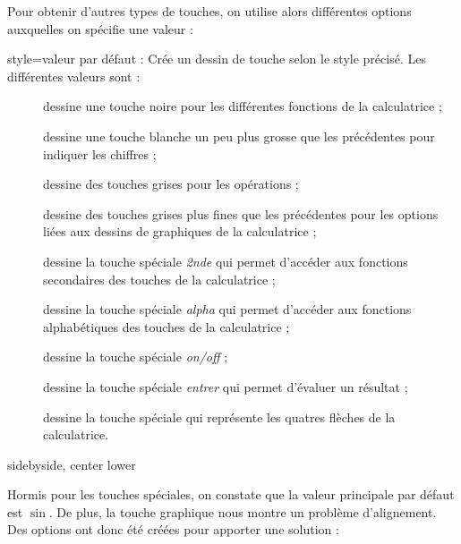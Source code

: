 \documentclass[10pt,french,a4paper]{article}
\begin{document}
Pour obtenir d'autres types de touches, on utilise alors différentes options auxquelles on spécifie une valeur :

\begin{docKey}{style}{=}{valeur par défaut : }
Crée un dessin de touche selon le style précisé. Les différentes valeurs sont :
\end{docKey}
\begin{description}
    \item[]  dessine une touche noire pour les différentes fonctions de la calculatrice ;
    \item[] dessine une touche blanche un peu plus grosse que les précédentes pour indiquer les chiffres ;
    \item[] dessine des touches grises pour les opérations ;
    \item[] dessine des touches grises plus fines que les précédentes pour les options liées aux dessins de graphiques de la calculatrice ;
    \item[] dessine la touche spéciale \textit{2nde} qui permet d'accéder aux fonctions secondaires des touches de la calculatrice ;
    \item[] dessine la touche spéciale \textit{alpha} qui permet d'accéder aux fonctions alphabétiques des touches de la calculatrice ;
    \item[] dessine la touche spéciale \textit{on/off} ;
    \item[] dessine la touche spéciale \textit{entrer} qui permet d'évaluer un résultat ;
    \item[] dessine la touche spéciale qui représente les quatres flèches de la calculatrice.
\end{description}

\begin{dispExample*}{sidebyside, center lower}
\Touche[style=function]
\Touche[style=number]
\Touche[style=operation]
\Touche[style=graph]
\Touche[style=second]

\Touche[style=alpha]
\Touche[style=enter]
\Touche[style=on]
\Touche[style=arrows]
\end{dispExample*}

Hormis pour les touches spéciales, on constate que la valeur principale par défaut est $\sin$. De plus, la touche graphique nous montre un problème d'alignement. Des options ont donc été créées pour apporter une solution :
\end{document}
